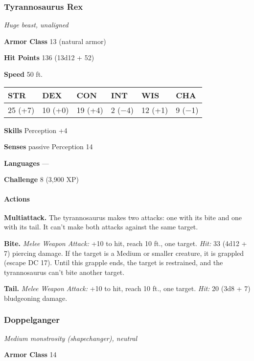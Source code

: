 \documentclass[
]{article}
\begin{document}
\hypertarget{tyrannosaurus-rex}{%
\subsubsection{Tyrannosaurus Rex}\label{tyrannosaurus-rex}}

\emph{Huge beast, unaligned}

\textbf{Armor Class} 13 (natural armor)

\textbf{Hit Points} 136 (13d12 + 52)

\textbf{Speed} 50 ft.

\begin{longtable}[]{@{}llllll@{}}
\toprule
STR & DEX & CON & INT & WIS & CHA\tabularnewline
\midrule
\endhead
25 (+7) & 10 (+0) & 19 (+4) & 2 (−4) & 12 (+1) & 9 (−1)\tabularnewline
\bottomrule
\end{longtable}

\textbf{Skills} Perception +4

\textbf{Senses} passive Perception 14

\textbf{Languages} ---

\textbf{Challenge} 8 (3,900 XP)

\hypertarget{actions-21}{%
\paragraph{Actions}\label{actions-21}}

\textbf{Multiattack.} The tyrannosaurus makes two attacks: one with its
bite and one with its tail. It can't make both attacks against the same
target.

\textbf{Bite.} \emph{Melee Weapon Attack:} +10 to hit, reach 10 ft., one
target. \emph{Hit:} 33 (4d12 + 7) piercing damage. If the target is a
Medium or smaller creature, it is grappled (escape DC 17). Until this
grapple ends, the target is restrained, and the tyrannosaurus can't bite
another target.

\textbf{Tail.} \emph{Melee Weapon Attack:} +10 to hit, reach 10 ft., one
target. \emph{Hit:} 20 (3d8 + 7) bludgeoning damage.

\hypertarget{doppelganger}{%
\subsubsection{Doppelganger}\label{doppelganger}}

\emph{Medium monstrosity (shapechanger), neutral}

\textbf{Armor Class} 14
\end{document}
